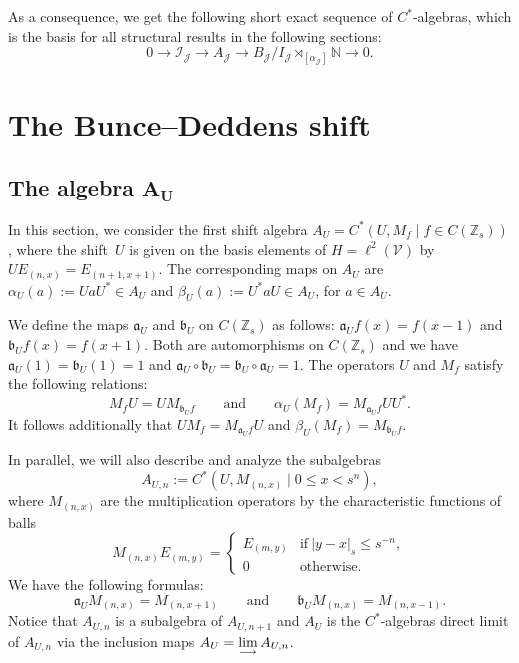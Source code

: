 \documentclass[pdftex]{sigma}
\newcommand{\N}{{\mathbb N}}
\newcommand{\Z}{{\mathbb Z}}
\newcommand{\fancyJ}{\mathcal{J}}
\numberwithin{equation}{section}
\begin{document}
As a consequence, we get the following short exact sequence of $C^*$-algebras, which is the basis for all structural results in the following sections:
\begin{equation}\label{SESequence}
0\to \mathcal{I}_\mathcal{J}\to A_\mathcal{J}\to B_\fancyJ/I_\fancyJ \rtimes_{[\alpha_\fancyJ]} \N\to 0.
\end{equation}

\section{The Bunce--Deddens shift}
\subsection[The algebra A\_U]{The algebra $\boldsymbol{A_U}$}
In this section, we consider the first shift algebra
$A_U=C^*(U,M_f\mid f\in C(\Z_s))$,
where the shift~$U$ is given on the basis elements of $H=\ell^2(\mathcal{V})$ by $UE_{(n,x)}= E_{(n+1, x+1)}$. The corresponding maps on $A_U$ are
$\alpha_U(a):=U aU^* \in A_U $ and $\beta_U(a):=U^* a U \in A_U$, for $a\in A_U$.

We define the maps $\mathfrak{a}_U$ and $\mathfrak{b}_U$ on $C(\Z_s)$ as follows:
$\mathfrak{a}_Uf(x) = f(x-1)$ and $\mathfrak{b}_Uf(x) = f(x+1) $.
Both are automorphisms on $C(\Z_s)$ and we have
$
\mathfrak{a}_U(1)=\mathfrak{b}_U(1)=1$ and ${\mathfrak{a}_U\circ\mathfrak{b}_U=\mathfrak{b}_U\circ\mathfrak{a}_U=1}$.
The operators $U$ and $M_f$ satisfy the following relations:
\[
M_fU=UM_{\mathfrak{b}_Uf}\qquad \text{and} \qquad \alpha_U(M_f)=\allowbreak M_{\mathfrak{a}_Uf}UU^* .
\]
It follows additionally that
$
UM_f=M_{\mathfrak{a}_Uf}U$ and $ \beta_U(M_f) = M_{\mathfrak{b}_U f}$.

In parallel, we will also describe and analyze the subalgebras
\[
A_{U,n}:=C^*(U,M_{(n,x)}\mid 0\le x < s^n),
\]
where $M_{(n,x)}$ are the multiplication operators by the characteristic functions of balls
\begin{equation*}
M_{(n,x)}E_{(m,y)} =
\begin{cases}
E_{(m,y)} &\textrm{if}\ |y-x|_s \le s^{-n},\\
0 &\textrm{otherwise}.
\end{cases}
\end{equation*}
We have the following formulas:
\begin{equation*}
\mathfrak{a}_UM_{(n,x)} = M_{(n,x+1)}\qquad\text{and}\qquad \mathfrak{b}_UM_{(n,x)} = M_{(n,x-1)} .
\end{equation*}
Notice that $A_{U,n}$ is a subalgebra of $A_{U,n+1}$ and $A_U$ is the $C^*$-algebras direct limit of $A_{U,n}$ via the inclusion maps
$A_U = \smash{\lim\limits_{\longrightarrow} A_{U,n}}$.
\end{document}

